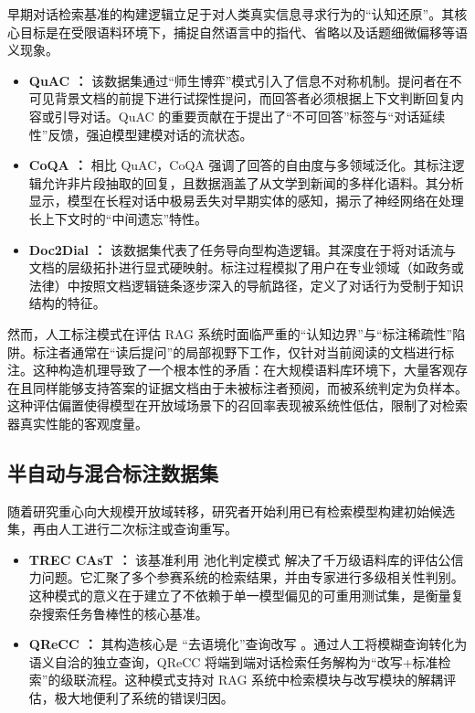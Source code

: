 早期对话检索基准的构建逻辑立足于对人类真实信息寻求行为的“认知还原”。其核心目标是在受限语料环境下，捕捉自然语言中的指代、省略以及话题细微偏移等语义现象。

\begin{itemize}
    \item \textbf{QuAC \citep{choi-etal-2018-quac}：} 该数据集通过“师生博弈”模式引入了信息不对称机制。提问者在不可见背景文档的前提下进行试探性提问，而回答者必须根据上下文判断回复内容或引导对话。QuAC 的重要贡献在于提出了“不可回答”标签与“对话延续性”反馈，强迫模型建模对话的流状态。
    \item \textbf{CoQA \citep{reddy-etal-2019-coqa}：} 相比 QuAC，CoQA 强调了回答的自由度与多领域泛化。其标注逻辑允许非片段抽取的回复，且数据涵盖了从文学到新闻的多样化语料。其分析显示，模型在长程对话中极易丢失对早期实体的感知，揭示了神经网络在处理长上下文时的“中间遗忘”特性。
    \item \textbf{Doc2Dial \citep{feng-etal-2020-doc2dial}：} 该数据集代表了任务导向型构造逻辑。其深度在于将对话流与文档的层级拓扑进行显式硬映射。标注过程模拟了用户在专业领域（如政务或法律）中按照文档逻辑链条逐步深入的导航路径，定义了对话行为受制于知识结构的特征。
\end{itemize}

然而，人工标注模式在评估 RAG 系统时面临严重的“认知边界”与“标注稀疏性”陷阱。标注者通常在“读后提问”的局部视野下工作，仅针对当前阅读的文档进行标注。这种构造机理导致了一个根本性的矛盾：在大规模语料库环境下，大量客观存在且同样能够支持答案的证据文档由于未被标注者预阅，而被系统判定为负样本。这种评估偏置使得模型在开放域场景下的召回率表现被系统性低估，限制了对检索器真实性能的客观度量。


\subsection{半自动与混合标注数据集}

随着研究重心向大规模开放域转移，研究者开始利用已有检索模型构建初始候选集，再由人工进行二次标注或查询重写。

\begin{itemize}
    \item \textbf{TREC CAsT \citep{Dalton2020TRECC2}：} 该基准利用 池化判定模式 解决了千万级语料库的评估公信力问题。它汇聚了多个参赛系统的检索结果，并由专家进行多级相关性判别。这种模式的意义在于建立了不依赖于单一模型偏见的可重用测试集，是衡量复杂搜索任务鲁棒性的核心基准。
    \item \textbf{QReCC \citep{anantha-etal-2021-qrecc}：} 其构造核心是 “去语境化”查询改写 。通过人工将模糊查询转化为语义自洽的独立查询，QReCC 将端到端对话检索任务解构为“改写+标准检索”的级联流程。这种模式支持对 RAG 系统中检索模块与改写模块的解耦评估，极大地便利了系统的错误归因。
\end{itemize}

